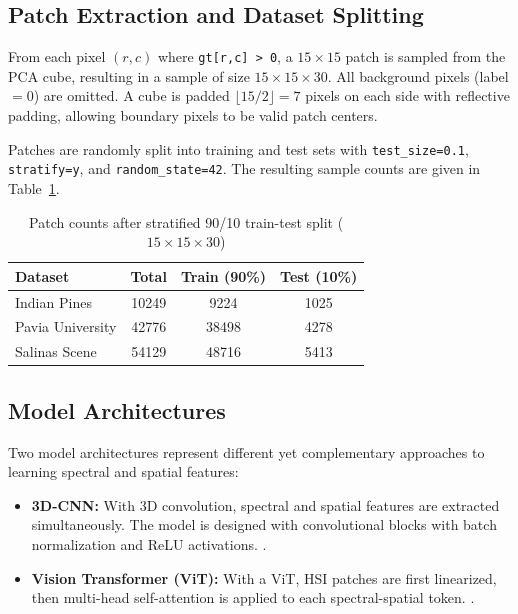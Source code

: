 \subsection{Patch Extraction and Dataset Splitting}
From each pixel $(r, c)$ where \texttt{gt[r,c] > 0}, a $15 \times 15$  patch is sampled from the PCA cube, resulting in a sample of size $15 \times 15 \times 30$. All background pixels (label $= 0$) are omitted. A cube is padded $\lfloor 15/2 \rfloor = 7$ pixels on each side with reflective padding, allowing boundary pixels to be valid patch centers.

Patches are randomly split into training and test sets with \texttt{test\_size=0.1}, \texttt{stratify=y}, and \texttt{random\_state=42}. The resulting sample counts are given in Table~\ref{tab:split_sizes}.

\begin{table}[H]
    \centering
    \caption{Patch counts after stratified 90/10 train-test split ($15 \times 15 \times 30$)}
    \label{tab:split_sizes}
    \renewcommand{\arraystretch}{1.2}
    \begin{tabular}{|l|c|c|c|}
        \hline
        \textbf{Dataset} & \textbf{Total} & \textbf{Train (90\%)} & \textbf{Test (10\%)} \\ \hline
        Indian Pines     & 10249 & 9224  & 1025  \\ \hline
        Pavia University & 42776 & 38498 & 4278  \\ \hline
        Salinas Scene    & 54129 & 48716 & 5413  \\ \hline
    \end{tabular}
\end{table}

\subsection{Model Architectures}
Two model architectures represent different yet complementary approaches to learning spectral and spatial features:
\begin{itemize}
    \item \textbf{3D-CNN:} With 3D convolution, spectral and spatial features are extracted simultaneously. The model is designed with convolutional blocks with batch normalization and ReLU activations. \cite{chen2016deep}.
    \item \textbf{Vision Transformer (ViT):} With a ViT, HSI patches are first linearized, then multi-head self-attention is applied to each spectral-spatial token. \cite{dosovitskiy2020image}.
\end{itemize}

